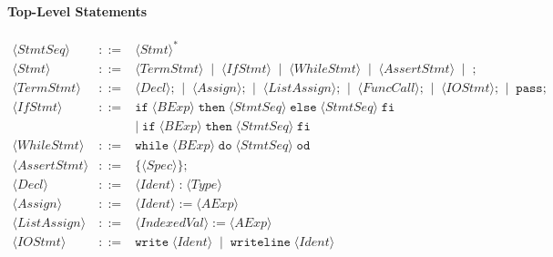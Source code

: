 \documentclass{article}
\begin{document}
\paragraph{Top-Level Statements}
\[
\begin{array}{rcl}
\langle \mathit{StmtSeq} \rangle
&::=&
\langle \mathit{Stmt} \rangle^* \\[4pt]

\langle \mathit{Stmt} \rangle
&::=&
\langle \mathit{TermStmt} \rangle
\;\mid\;
\langle \mathit{IfStmt} \rangle
\;\mid\;
\langle \mathit{WhileStmt} \rangle
\;\mid\;
\langle \mathit{AssertStmt} \rangle
\;\mid\;
\texttt{;} \\[4pt]

\langle \mathit{TermStmt} \rangle
&::=&
\langle \mathit{Decl} \rangle\texttt{;}
\;\mid\;
\langle \mathit{Assign} \rangle\texttt{;}
\;\mid\;
\langle \mathit{ListAssign} \rangle\texttt{;}
\;\mid\;
\langle \mathit{FuncCall} \rangle\texttt{;}
\;\mid\;
\langle \mathit{IOStmt} \rangle\texttt{;}
\;\mid\;
\mathtt{pass}\texttt{;} \\[4pt]

\langle \mathit{IfStmt} \rangle
&::=&
\mathtt{if}\;\langle \mathit{BExp} \rangle\;\mathtt{then}\;\langle \mathit{StmtSeq} \rangle\;\mathtt{else}\;\langle \mathit{StmtSeq} \rangle\;\mathtt{fi} \\
&& \mid\;
\mathtt{if}\;\langle \mathit{BExp} \rangle\;\mathtt{then}\;\langle \mathit{StmtSeq} \rangle\;\mathtt{fi} \\[4pt]

\langle \mathit{WhileStmt} \rangle
&::=&
\mathtt{while}\;\langle \mathit{BExp} \rangle\;\mathtt{do}\;\langle \mathit{StmtSeq} \rangle\;\mathtt{od} \\[4pt]

\langle \mathit{AssertStmt} \rangle
&::=&
\{\langle \mathit{Spec} \rangle\}\texttt{;} \\[4pt]

\langle \mathit{Decl} \rangle
&::=&
\langle \mathit{Ident} \rangle\;\texttt{:}\;\langle \mathit{Type} \rangle \\[4pt]

\langle \mathit{Assign} \rangle
&::=&
\langle \mathit{Ident} \rangle\;\texttt{:=}\;\langle \mathit{AExp} \rangle \\[4pt]

\langle \mathit{ListAssign} \rangle
&::=&
\langle \mathit{IndexedVal} \rangle\;\texttt{:=}\;\langle \mathit{AExp} \rangle \\[4pt]

\langle \mathit{IOStmt} \rangle
&::=&
\mathtt{write}\;\langle \mathit{Ident} \rangle
\;\mid\; \mathtt{writeline}\;\langle \mathit{Ident} \rangle

\end{array}
\]
\end{document}
